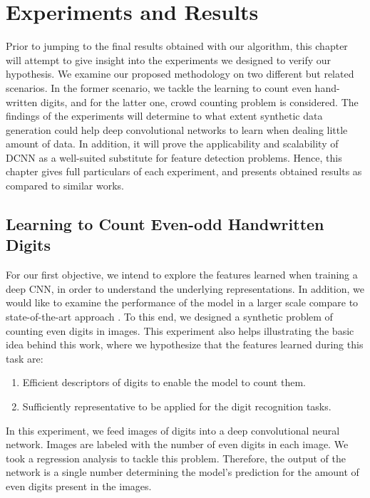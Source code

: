 \newpage
\chapter{Experiments and Results}
\label{sec:experiments}

Prior to jumping to the final results obtained with our algorithm, this chapter will attempt to give insight into the experiments we designed to verify our hypothesis. We examine our proposed methodology on two different but related scenarios. In the former scenario, we tackle the learning to count even hand-written digits, and for the latter one, crowd counting problem is considered. The findings of the experiments will determine to what extent synthetic data generation could help deep convolutional networks to learn when dealing little amount of data. In addition, it will prove the applicability and scalability of DCNN as a well-suited substitute for feature detection problems. Hence, this chapter gives full particulars of each experiment, and presents obtained results as compared to similar works.

\section{Learning to Count Even-odd Handwritten Digits}

For our first objective, we intend to explore the features learned when training a deep CNN, in order to understand the underlying representations. In addition, we would like to examine the performance of the model in a larger scale compare to state-of-the-art approach \cite{segui2015learning}. To this end, we designed a synthetic problem of counting even digits in images. This experiment also helps illustrating the basic idea behind this work, where we hypothesize that the features learned during this task are:
\begin{enumerate}
\item Efficient descriptors of digits to enable the model to count them.
\item Sufficiently representative to be applied for the digit recognition tasks.  
\end{enumerate}

In this experiment, we feed images of digits into a deep convolutional neural network. Images are labeled with the number of even digits in each image. We took a regression analysis to tackle this problem. Therefore, the output of the network is a single number determining the model's prediction for the amount of even digits present in the images. 
 


